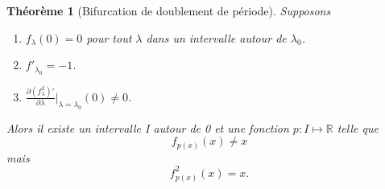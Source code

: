 \documentclass{article}
\theoremstyle{definition}
\theoremstyle{plain}
\newtheorem{thm}{Théorème}
\theoremstyle{remark}
\begin{document}
\begin{thm}[Bifurcation de doublement de période]
    Supposons
    \begin{enumerate}
        \item $f_\lambda (0) = 0$ pour tout $\lambda$ dans un intervalle
            autour de $\lambda_0$.
        \item $f'_{\lambda_0} = -1$.
        \item $\displaystyle{\frac{\partial (f^2_\lambda)'}{\partial \lambda}
                \Bigg\rvert_{\lambda = \lambda_0} (0) \neq 0}$.
    \end{enumerate}
    Alors il existe un intervalle I autour de 0 et une fonction $p:I\mapsto\mathbb{R}$
    telle que \[f_{p(x)}(x) \neq x\] mais \[f^2_{p(x)}(x) = x.\]
\end{thm}
\end{document}
